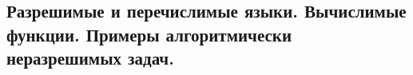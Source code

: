 \subsection{Разрешимые и перечислимые языки. Вычислимые функции. Примеры алгоритмически неразрешимых задач.}
